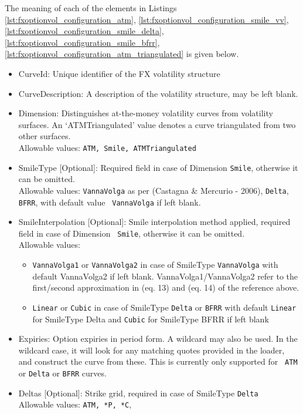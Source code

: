 \documentclass[12pt, a4paper]{article}
\begin{document}
{{The meaning of each of the elements in Listings \ref{lst:fxoptionvol_configuration_atm},
\ref{lst:fxoptionvol_configuration_smile_vv}, \ref{lst:fxoptionvol_configuration_smile_delta},
\ref{lst:fxoptionvol_configuration_smile_bfrr}, \ref{lst:fxoptionvol_configuration_atm_triangulated} is given below.

\begin{itemize}
\item CurveId: Unique identifier of the FX volatility structure
\item CurveDescription: A description of the volatility structure, may be left blank.
\item Dimension: Distinguishes at-the-money volatility curves from volatility surfaces. An `ATMTriangulated' value
  denotes a curve triangulated from two other surfaces.\\ Allowable values: {\tt ATM, Smile, ATMTriangulated}
\item SmileType [Optional]: Required field in case of Dimension {\tt Smile}, otherwise it can be omitted. \\ Allowable
  values: {\tt VannaVolga} as per (Castagna \& Mercurio - 2006), {\tt Delta}, {\tt BFRR}, with default value {\tt
    VannaVolga} if left blank.
\item SmileInterpolation [Optional]: Smile interpolation method applied, required field in case of Dimension {\tt
  Smile}, otherwise it can be omitted. \\ Allowable values:
\begin{itemize}
\item {\tt VannaVolga1} or {\tt VannaVolga2} in case of SmileType {\tt VannaVolga} with default VannaVolga2 if left
  blank.  VannaVolga1/VannaVolga2 refer to the first/second approximation in (eq. 13) and (eq. 14) of the reference
  above.
\item {\tt Linear} or {\tt Cubic} in case of SmileType {\tt Delta} or {\tt BFRR} with default {\tt Linear} for SmileType
  Delta and {\tt Cubic} for SmileType BFRR if left blank
\end{itemize}
\item Expiries: Option expiries in period form. A wildcard may also be used. In the wildcard case, it will look for any
  matching quotes provided in the loader, and construct the curve from these. This is currently only supported for {\tt
    ATM} or {\tt Delta} or {\tt BFRR} curves.
\item Deltas [Optional]: Strike grid, required in case of SmileType {\tt Delta} \\ Allowable values: {\tt ATM, *P, *C},

\end{itemize}}}
\end{document}
